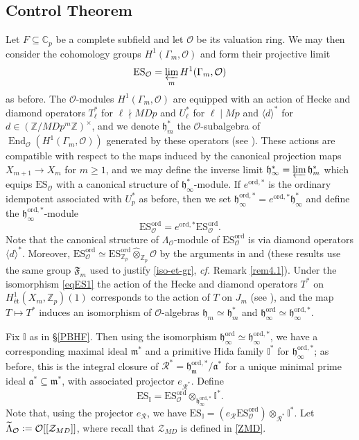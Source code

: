 \documentclass[a4paper,11pt]{amsart}
\numberwithin{equation}{section}
\theoremstyle{plain}
\theoremstyle{definition}
\theoremstyle{remark}
\newcommand{\Z}{\mathbb{Z}}
\newcommand{\C}{\mathbb{C}}
\newcommand{\I}{\mathbb{I}}
\newcommand{\defeq}{\vcentcolon=}
\DeclareMathOperator{\End}{End}
\newcommand{\ord}{\mathrm{ord}}
\newcommand{\ES}{\mathrm{ES}}
\newcommand{\invlim}{\mathop{\varprojlim}\limits}
\begin{document}
\subsection{Control Theorem}\label{sec.controltheorem} Let $F\subseteq\C_p$ be a complete subfield and let $\mathcal{O}$ be its valuation ring. We may then consider the cohomology groups 
$H^1(\Gamma_m,\mathcal{O})$ and form their projective limit  
\[\ES_\mathcal{O}=\invlim_mH^1(\Gamma_m,\mathcal{O})\] as before. 
The $\mathcal{O}$-modules $H^1(\Gamma_m,\mathcal{O})$ are equipped with an action of 
Hecke and diamond operators $T^*_\ell$ for $\ell\nmid MDp$ and $U^*_\ell$ for $\ell\mid Mp$ and $\langle d\rangle^*$ for $d\in (\Z/MDp^m\Z)^\times$, 
and we denote $\mathfrak{h}_m^*$ the $\mathcal{O}$-subalgebra of 
$\End_\mathcal{O}(H^1(\Gamma_m,\mathcal{O}))$ generated by these operators
(see \cite[\S2.1]{LV-IJNT}). 
These actions are compatible with respect to the maps induced by the canonical projection maps $X_{m+1}\rightarrow X_m$ for $m\geq 1$, and we may define 
the inverse limit ${\mathfrak{h}}_\infty^*=\invlim{\mathfrak{h}}_m^*$ which equips $\ES_\mathcal{O}$ with a canonical structure 
of $\mathfrak{h}^*_\infty$-module. If $e^{\ord,*}$ is the ordinary idempotent associated with $U_p^*$ as before, then we set $\mathfrak{h}_\infty^{\ord,*}=e^{\ord,*}\mathfrak{h}_\infty^*$ and 
define the $\mathfrak{h}_\infty^{\ord,*}$-module 
\[\ES^\ord_\mathcal{O}=e^{\ord,*}\ES_{\mathcal{O}}^\ord.\] 
Note that the canonical structure of $\Lambda_\mathcal{O}$-module of $\ES^\ord_\mathcal{O}$ is via diamond operators $\langle d\rangle^*$. Moreover, $\ES_\mathcal{O}^\ord\simeq\ES^\ord_{\Z_p}\hat\otimes_{\Z_p}\mathcal{O}$ by the arguments in \cite[Lemma (1.2.11)]{Ohta-ES} and \cite[Lemma (1.2.12)]{Ohta-ES} (these results use the same group $\mathfrak{F}_m$ used to justify \eqref{iso-et-gr}, \emph{cf.} Remark \ref{rem4.1}). 
Under the isomorphism \eqref{eqES1} 
the action of the Hecke and diamond operators $T^*$ on $H^1_\text{\'et}(X_m,\Z_p)(1)$ corresponds to the action of $T$ on $J_m$ (see \cite[\S8]{hida-galois}), and  
the map $T\mapsto T^*$ induces an isomorphism of $\mathcal{O}$-algebras $\mathfrak{h}_m\simeq \mathfrak{h}_m^*$
and $\mathfrak{h}_\infty^\ord\simeq \mathfrak{h}_\infty^{\ord,*}$.

Fix $\I$ as in \S\ref{PBHF}. Then using the isomorphism $\mathfrak{h}_\infty^\ord\simeq \mathfrak{h}_\infty^{\ord,*}$, we have a corresponding maximal ideal $\mathfrak{m}^*$ and a primitive Hida family $\I^*$ for $\mathfrak{h}_\infty^{\ord,*}$; as before, this is the integral closure of $\mathcal{R}^*=\mathfrak{h}_\mathfrak{m}^{\ord,*}/\mathfrak{a}^*$ for a unique minimal 
prime ideal $\mathfrak{a}^*\subseteq\mathfrak{m}^*$, with associated projector $e_{\mathcal{R}^*}$. 
Define \[\ES_\I=\ES_\mathcal{O}^\ord\otimes_{\mathfrak{h}_\infty^{\ord,*}}\I^*.\] 
Note that, using the projector $e_\mathcal{R}$, we have 
$\ES_\I=(e_\mathcal{R}\ES_\mathcal{O}^\ord)\otimes_{\mathcal{R}^*}\I^*$.  
Let $\widetilde{\Lambda}_\mathcal{O}\defeq\mathcal{O}[[\mathcal{Z}_{MD}]]$, 
where recall that $\mathcal{Z}_{MD}$  is defined in \eqref{ZMD}.
\end{document}
